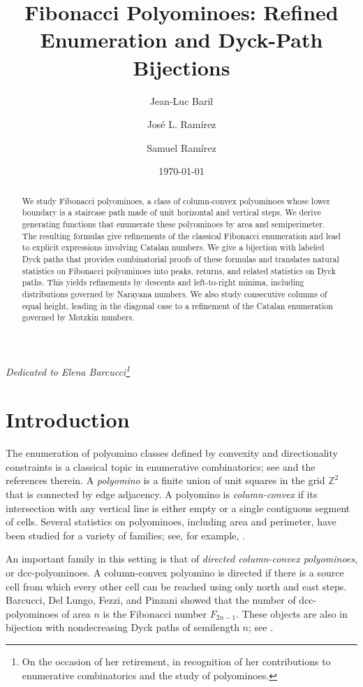 \documentclass[12pt]{amsart}
\title{Fibonacci Polyominoes: Refined Enumeration and Dyck-Path Bijections}
\author[J.-L. Baril]{Jean-Luc Baril}
\author[J.L. Ram\'irez]{Jos\'e L. Ram\'irez}
\author[S. Ram\'irez]{Samuel Ram\'irez}
\date{\today}
\theoremstyle{plain}
\theoremstyle{definition}
\newcommand{\Z}{{\mathbb Z}}
\begin{document}
\newcommand{\nadji}[1]{\mbox{}{\sf\color{green}[Ram\'{\i}rez: #1]}\marginpar{\color{green}\Large$*$}} 


\begin{abstract}
We study Fibonacci polyominoes, a class of column-convex polyominoes whose lower boundary is a staircase path made of unit horizontal and vertical steps. We derive generating functions that enumerate these polyominoes by area and semiperimeter. The resulting formulas give refinements of the classical Fibonacci enumeration and lead to explicit expressions involving Catalan numbers. We give a bijection with labeled Dyck paths that provides combinatorial proofs of these
formulas and translates natural statistics on Fibonacci polyominoes into peaks, returns, and related statistics on Dyck paths. This yields
refinements by descents and left-to-right minima, including distributions governed by Narayana numbers. We also study consecutive columns of equal height, leading in the diagonal case to a refinement of the Catalan enumeration governed by Motzkin numbers.
\end{abstract}

\maketitle

\begin{center}
\emph{Dedicated to Elena Barcucci\footnote{On the occasion of her retirement, in recognition of her contributions to enumerative combinatorics and the study of polyominoes.}}
\end{center}


\section{Introduction}

The enumeration of polyomino classes defined by convexity and directionality constraints is a classical topic in enumerative combinatorics; see \cite{Book1} and the references therein. A \emph{polyomino} is a finite union of unit squares in the grid $\Z^2$ that is connected by edge adjacency. A polyomino is \emph{column-convex} if its intersection with any vertical line is either empty or a single contiguous segment of cells. Several statistics on polyominoes, including area and perimeter, have been studied for a variety of families; see, for example, \cite{BleBreKnop3,Bou,ManSha2}.


An important family in this setting is that of \emph{directed column-convex polyominoes}, or dcc-polyominoes. A column-convex polyomino is directed if there is a source cell from which every other cell can be reached using only north and east steps. Barcucci, Del Lungo, Fezzi, and Pinzani showed that the number of dcc-polyominoes of area $n$ is the Fibonacci number $F_{2n-1}$. These objects are also in bijection with nondecreasing Dyck paths of semilength $n$; see \cite{BarDelFezPin, DeutschP, FlorezJoseJunes}.
\end{document}
